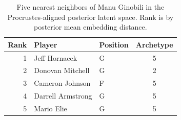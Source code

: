 \begin{table}[htbp]
  \centering\small
  \begin{tabular}{rllc}
    \toprule
    Rank & Player & Position & Archetype \\
    \midrule
    1 & Jeff Hornacek & G & 5 \\
    2 & Donovan Mitchell & G & 2 \\
    3 & Cameron Johnson & F & 5 \\
    4 & Darrell Armstrong & G & 5 \\
    5 & Mario Elie & G & 5 \\
    \bottomrule
  \end{tabular}
  \caption{Five nearest neighbors of Manu Ginobili in the Procrustes-aligned posterior latent space. Rank is by posterior mean embedding distance.}
  \label{tab:Manu_Ginobili_neighbors}
\end{table}

